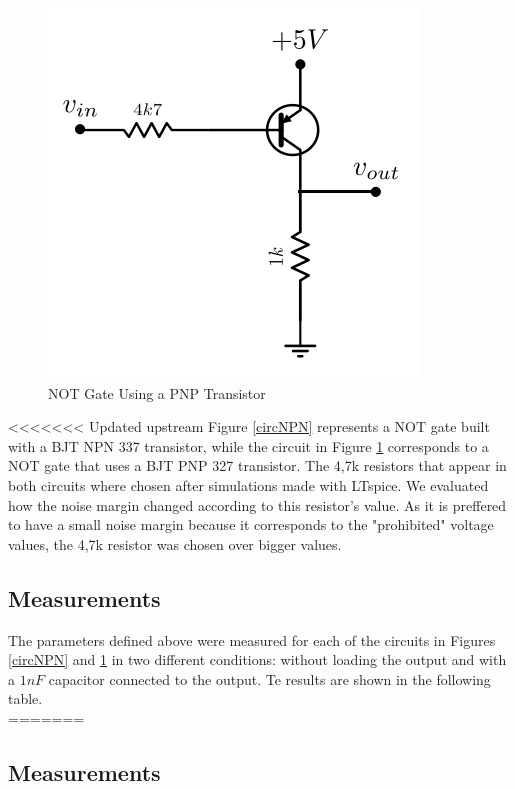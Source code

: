 \documentclass[a4paper,11pt]{report}
\begin{document}
\begin{figure}[h!]
\centering
\includegraphics[scale=1]{../Exercise1/circuitoPNP}
\caption{NOT Gate Using a PNP Transistor}
\label{circPNP}
\end{figure}

<<<<<<< Updated upstream
Figure \ref{circNPN} represents a NOT gate built with a BJT NPN 337 transistor, while the circuit in Figure \ref{circPNP} corresponds to a NOT gate that uses a BJT PNP 327 transistor. The 4,7k{\textOmega} resistors that appear in both circuits where chosen after simulations made with LTspice. We evaluated how the noise margin changed according to this resistor's value. As it is preffered to have a small noise margin because it corresponds to the "prohibited" voltage values, the 4,7k{\textOmega} resistor was chosen over bigger values.




\subsection{\color{purple}Measurements}

The parameters defined above were measured for each of the circuits in Figures \ref{circNPN} and \ref{circPNP} in two different conditions: without loading the output and with a $1 nF$ capacitor connected to the output. Te results are shown in the following table. \\
=======
\subsection{\color{purple}Measurements}
\end{document}
